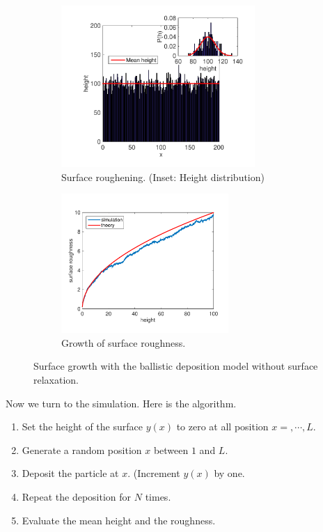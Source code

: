 \begin{figure}
	\centering
	\begin{subfigure}{0.45\textwidth}
		\centering
		\includegraphics[width=2.9in]{15.Random-Numbers/bd1-height.pdf}	
		\caption{Surface roughening.  (Inset: Height distribution)}
		\label{fig:bd1_height}
	\end{subfigure}
	\begin{subfigure}{0.45\textwidth}
		\centering
		\includegraphics[width=2.5in]{15.Random-Numbers/bd1-roughness.pdf}
		\caption{Growth of surface roughness.}
		\raisebox{6pt}{}
		\label{fig:bd1_roughness}
	\end{subfigure}
	\caption{Surface growth with the ballistic deposition model without surface relaxation.}\label{fig:bd1}
\end{figure}

Now we turn to the simulation.  Here is the algorithm.
\bigskip
\begin{myalgobox}

\medskip
\begin{minipage}{5.5in}
\begin{enumerate}
\item Set the height of the surface $y(x)$ to zero at all position $x=, \cdots, L$.
\item Generate a random position $x$ between $1$ and $L$. 
\item Deposit the particle at $x$.  (Increment $y(x)$ by one.
\item Repeat the deposition for $N$ times.
\item Evaluate the mean height and the roughness.
\end{enumerate}
\end{minipage}

\end{myalgobox}


